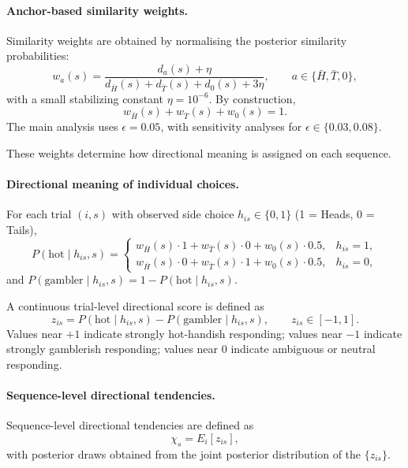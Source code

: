 \documentclass[11pt,a4paper]{article}
\numberwithin{equation}{section}
\begin{document}
\paragraph{Anchor-based similarity weights.}

Similarity weights are obtained by normalising the posterior similarity
probabilities:
\[
w_a(s)
=
\frac{d_a(s) + \eta}
{d_{\bar{H}}(s) + d_{\bar{T}}(s) + d_0(s) + 3\eta},
\qquad
a \in \{\bar{H}, \bar{T}, 0\},
\]
with a small stabilizing constant \(\eta = 10^{-6}\).
By construction,
\[
w_{\bar{H}}(s) + w_{\bar{T}}(s) + w_0(s) = 1.
\]
The main analysis uses \(\epsilon = 0.05\), with sensitivity analyses for
\(\epsilon \in \{0.03, 0.08\}\).

These weights determine how directional meaning is assigned on each sequence.

\paragraph{Directional meaning of individual choices.}

For each trial \((i,s)\) with observed side choice \(h_{is}\in\{0,1\}\)
(1 = Heads, 0 = Tails),
\[
P(\text{hot}\mid h_{is},s)=
\begin{cases}
	w_{\bar{H}}(s)\cdot 1 + w_{\bar{T}}(s)\cdot 0 + w_0(s)\cdot 0.5,
	& h_{is}=1,\\[6pt]
	w_{\bar{H}}(s)\cdot 0 + w_{\bar{T}}(s)\cdot 1 + w_0(s)\cdot 0.5,
	& h_{is}=0,
\end{cases}
\]
and \(P(\text{gambler}\mid h_{is},s)=1-P(\text{hot}\mid h_{is},s)\).

A continuous trial-level directional score is defined as
\[
z_{is}
= P(\text{hot}\mid h_{is},s) - P(\text{gambler}\mid h_{is},s),
\qquad
z_{is}\in[-1,1].
\]
Values near \(+1\) indicate strongly hot-handish responding; values near \(-1\)
indicate strongly gamblerish responding; values near \(0\) indicate ambiguous or
neutral responding.

\paragraph{Sequence-level directional tendencies.}

Sequence-level directional tendencies are defined as
\[
\chi_s = E_i[z_{is}],
\]
with posterior draws obtained from the joint posterior distribution of the
\(\{z_{is}\}\).
\end{document}
